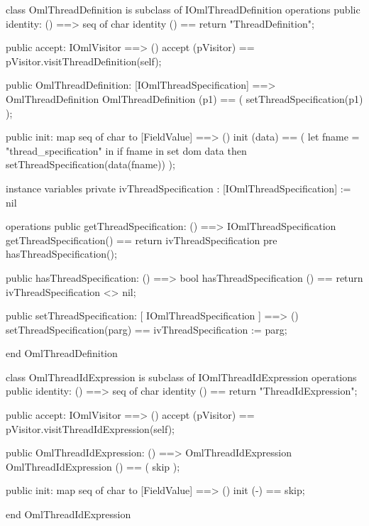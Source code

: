 \begin{vdm_al}
class OmlThreadDefinition is subclass of IOmlThreadDefinition
operations
  public identity: () ==> seq of char
  identity () == return "ThreadDefinition";

  public accept: IOmlVisitor ==> ()
  accept (pVisitor) == pVisitor.visitThreadDefinition(self);

  public OmlThreadDefinition:
      [IOmlThreadSpecification] ==> OmlThreadDefinition
  OmlThreadDefinition (p1) == 
   ( setThreadSpecification(p1) );

  public init: map seq of char to [FieldValue] ==> ()
  init (data) ==
    ( let fname = "thread_specification" in
        if fname in set dom data
        then setThreadSpecification(data(fname)) );

instance variables
  private ivThreadSpecification : [IOmlThreadSpecification] := nil

operations
  public getThreadSpecification: () ==> IOmlThreadSpecification
  getThreadSpecification() == return ivThreadSpecification
    pre hasThreadSpecification();

  public hasThreadSpecification: () ==> bool
  hasThreadSpecification () == return ivThreadSpecification <> nil;

  public setThreadSpecification: [ IOmlThreadSpecification ] ==> ()
  setThreadSpecification(parg) == ivThreadSpecification := parg;

end OmlThreadDefinition
\end{vdm_al}

\begin{vdm_al}
class OmlThreadIdExpression is subclass of IOmlThreadIdExpression
operations
  public identity: () ==> seq of char
  identity () == return "ThreadIdExpression";

  public accept: IOmlVisitor ==> ()
  accept (pVisitor) == pVisitor.visitThreadIdExpression(self);

  public OmlThreadIdExpression:
      () ==> OmlThreadIdExpression
  OmlThreadIdExpression () == 
    ( skip );

  public init: map seq of char to [FieldValue] ==> ()
  init (-) == skip;

end OmlThreadIdExpression
\end{vdm_al}

